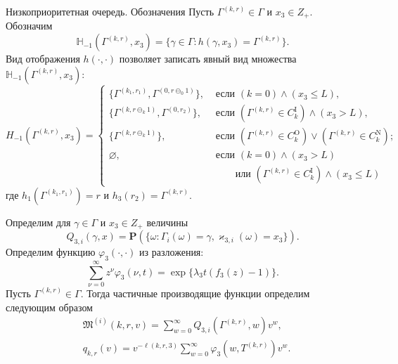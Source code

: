 \documentclass[10pt]{beamer}
\begin{document}
\begin{frame}[allowframebreaks]{Низкоприоритетная очередь. Обозначения}
Пусть $\Gamma^{(k,r)}\in \Gamma$ и $x_3 \in Z_+$. Обозначим 
$$
{\mathbb H}_{-1}(\Gamma^{(k,r)}, x_3) = \{\gamma \in \Gamma \colon h(\gamma, x_3) = \Gamma^{(k,r)}\}.
$$
Вид отображения $h(\cdot,\cdot)$ позволяет записать явный вид множества ${\mathbb H}_{-1}(\Gamma^{(k,r)}, x_3)$:
\begin{equation*}
H_{-1}(\Gamma^{(k,r)}, x_3) = 
\begin{cases}
\bigl\{\Gamma^{(k_1,r_1)}, \Gamma^{(0,r\ominus_0 1)}\bigr\},&  \text{ если  $(k=0) \wedge (x_3 \leqslant L)$,}\\
\bigl\{\Gamma^{(k,r\ominus_k 1)}, \Gamma^{(0,r_2)}\bigr\},&  \text{ если  $(\Gamma^{(k,r)}\in C_k^{\mathrm{I}})
  \wedge (x_3>L)$,}\\ 
\bigl\{\Gamma^{(k,r\ominus_k 1)}\bigr\},&  \text{ если  $(\Gamma^{(k,r)}\in C_k^{\mathrm{O}}) \vee (\Gamma^{(k,r)}\in C_k^{\mathrm{N}})$;}\\
\varnothing,&  \text{ если  $(k = 0)\wedge  (x_3>L)$}\\
 & \qquad \text{ или $(\Gamma^{(k,r)}\in C_k^{\mathrm{I}}) \wedge (x_3\leqslant L)$}
\end{cases}
\end{equation*}
где $h_1(\Gamma^{(k_1,r_1)})=r$ и $h_3(r_2)=\Gamma^{(k,r)}$.
\framebreak

Определим для  $\gamma \in \Gamma$ и $x_3 \in Z_+$ величины
\begin{equation*}
Q_{3,i}(\gamma,x) = {\mathbf P}(\{\omega\colon \Gamma_{i}(\omega)=\gamma, \varkappa_{3,i}(\omega)=x_3\}).
\end{equation*}
Определим функцию $\varphi_3(\cdot,\cdot)$ из разложения:
\begin{equation*}
\sum_{\nu=0}^{\infty} z^\nu\varphi_3(\nu,t) = \exp\{\lambda_3 t (f_3(z)-1)\}.
\end{equation*}
Пусть $\Gamma^{(k,r)}\in \Gamma$. Тогда частичные производящие функции определим следующим образом
\begin{align*}
&\mathfrak{M}^{(i)}(k,r,v) = \sum_{w=0}^{\infty} Q_{3,i}(\Gamma^{(k,r)},w) v^w,\\
&q_{k,r}(v) = v^{-\ell(k,r,3)}\sum_{w=0}^{\infty} \varphi_3(w,T^{(k,r)})v^w.
\end{align*}
\end{frame}
\end{document}
